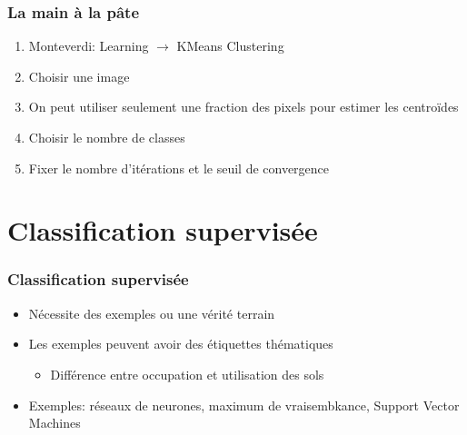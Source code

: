 \documentclass[compress]{beamer}
\begin{document}
\begin{frame}
  \frametitle{La main à la pâte}
  \begin{enumerate}
  \item Monteverdi: Learning $\rightarrow$ KMeans Clustering
  \item Choisir une image
  \item On peut utiliser seulement une fraction des pixels pour
    estimer les centroïdes
  \item Choisir le nombre de classes
  \item Fixer le nombre d'itérations et le seuil de convergence
  \end{enumerate}    
\end{frame}
\section[Supervised]{Classification supervisée}
\label{sec:supervised}
\begin{frame}
  \frametitle{Classification supervisée}
  \begin{itemize}
  \item Nécessite des exemples ou une vérité terrain
  \item Les exemples peuvent avoir des étiquettes thématiques
    \begin{itemize}
    \item Différence entre occupation et utilisation des sols
    \end{itemize}
  \item Exemples: réseaux de neurones, maximum de vraisembkance, Support Vector Machines
  \end{itemize}
\end{frame}
\end{document}
